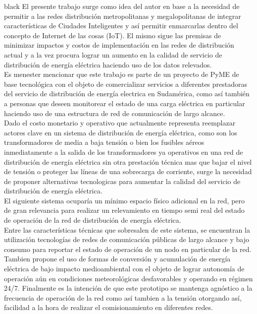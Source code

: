 \documentclass[11pt]{charter}
\begin{document}
\begin{consigna}{black}
El presente trabajo surge como idea del autor en base a la necesidad de permitir a las redes distribución metropolitanas y megalopolitanas de integrar características de Ciudades Inteligentes y así permitir enmarcarlas dentro del concepto de Internet de las cosas (IoT). El mismo sigue las premisas de minimizar impactos y costos de implementación en las redes de distribución actual y a la vez procura lograr un aumento en la calidad de servicio de distribución de energía eléctrica haciendo uso de los datos relevados.\\
Es menester mencionar que este trabajo es parte de un proyecto de PyME de base tecnológica con el objeto de comercializar servicios a diferentes prestadoras del servicio de distribución de energía electrica en Sudamérica, como así también a personas que deseen monitorear el estado de una carga eléctrica en particular haciendo uso de una estructura de red de comunicación de largo alcance.\\
Dado el costo monetario y operativo que actualmente representa reemplazar actores clave en un sistema de distribución de energía eléctrica, como son los transformadores de media a baja tensión o bien los fusibles aéreos inmediatamente a la salida de los transformadores ya operativos en una red de distribución de energía eléctrica sin otra prestación técnica mas que bajar el nivel de tensión o proteger las líneas de una sobrecarga de corriente, surge la necesidad de proponer alternativas tecnologicas para aumentar la calidad del servicio de distribución de energía eléctrica.\\
El siguiente sistema ocuparía un mínimo espacio físico adicional en la red, pero de gran relevancia para realizar un relevamiento en tiempo semi real del estado de operación de la red de distribución de energía eléctrica.\\
Entre las características técnicas que sobresalen de este sistema, se encuentran la utilización tecnologías de redes de comunicación públicas de largo alcance y bajo consumo para reportar el estado de operación de un nodo en particular de la red. Tambien propone el uso de formas de conversión y acumulación de energía eléctrica de bajo impacto medioambiental con el objeto de lograr autonomía de operación aún en condiciones meteorológicas desfavorables y operando en régimen 24/7. Finalmente es la intención de que este prototipo se mantenga agnóstico a la frecuencia de operación de la red como así tambien a la tensión otorgando así, facilidad a la hora de realizar el comisionamiento en diferentes redes.\\



\end{consigna}
\end{document}
